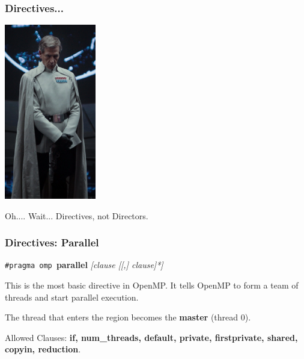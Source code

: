 \begin{frame}
\frametitle{Directives...}

\begin{center}
	\includegraphics[width=0.3\textwidth]{images/krennic.png}
\end{center}

Oh.... Wait... Directives, not Directors.

\end{frame}



\begin{frame}
\frametitle{Directives: Parallel}

  \begin{center}
    {\tt \#pragma omp }{\bf parallel} {\it [clause [[,] clause]*]}
  \end{center}

This is the most basic directive in OpenMP.
It tells OpenMP to form a team of threads and start parallel execution.


The thread that enters the region becomes the {\bf master} (thread 0).

Allowed Clauses: {\bf if, num\_threads, default, private, firstprivate,
    shared, copyin, reduction}.

\end{frame}


